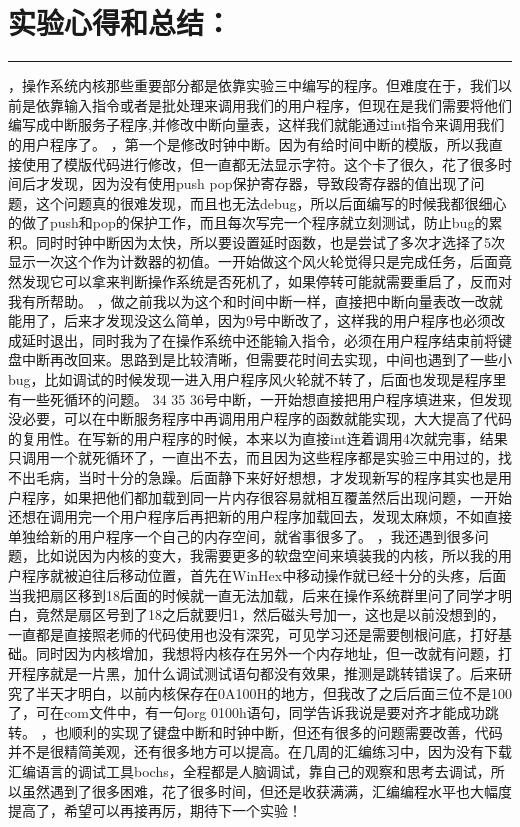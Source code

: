 \documentclass[UTF8]{article}
\begin{document}
\section{实验心得和总结：}
\noindent\rule[0.2\baselineskip]{\textwidth}{0.5pt}
\heiti
{}，操作系统内核那些重要部分都是依靠实验三中编写的程序。但难度在于，我们以前是依靠输入指令或者是批处理来调用我们的用户程序，但现在是我们需要将他们编写成中断服务子程序,并修改中断向量表，这样我们就能通过int指令来调用我们的用户程序了。
，第一个是修改时钟中断。因为有给时间中断的模版，所以我直接使用了模版代码进行修改，但一直都无法显示字符。这个卡了很久，花了很多时间后才发现，因为没有使用push pop保护寄存器，导致段寄存器的值出现了问题，这个问题真的很难发现，而且也无法debug，所以后面编写的时候我都很细心的做了push和pop的保护工作，而且每次写完一个程序就立刻测试，防止bug的累积。同时时钟中断因为太快，所以要设置延时函数，也是尝试了多次才选择了5次显示一次这个作为计数器的初值。一开始做这个风火轮觉得只是完成任务，后面竟然发现它可以拿来判断操作系统是否死机了，如果停转可能就需要重启了，反而对我有所帮助。
，做之前我以为这个和时间中断一样，直接把中断向量表改一改就能用了，后来才发现没这么简单，因为9号中断改了，这样我的用户程序也必须改成延时退出，同时我为了在操作系统中还能输入指令，必须在用户程序结束前将键盘中断再改回来。思路到是比较清晰，但需要花时间去实现，中间也遇到了一些小bug，比如调试的时候发现一进入用户程序风火轮就不转了，后面也发现是程序里有一些死循环的问题。
 34 35 36号中断，一开始想直接把用户程序填进来，但发现没必要，可以在中断服务程序中再调用用户程序的函数就能实现，大大提高了代码的复用性。在写新的用户程序的时候，本来以为直接int连着调用4次就完事，结果只调用一个就死循环了，一直出不去，而且因为这些程序都是实验三中用过的，找不出毛病，当时十分的急躁。后面静下来好好想想，才发现新写的程序其实也是用户程序，如果把他们都加载到同一片内存很容易就相互覆盖然后出现问题，一开始还想在调用完一个用户程序后再把新的用户程序加载回去，发现太麻烦，不如直接单独给新的用户程序一个自己的内存空间，就省事很多了。
，我还遇到很多问题，比如说因为内核的变大，我需要更多的软盘空间来填装我的内核，所以我的用户程序就被迫往后移动位置，首先在WinHex中移动操作就已经十分的头疼，后面当我把扇区移到18后面的时候就一直无法加载，后来在操作系统群里问了同学才明白，竟然是扇区号到了18之后就要归1，然后磁头号加一，这也是以前没想到的，一直都是直接照老师的代码使用也没有深究，可见学习还是需要刨根问底，打好基础。同时因为内核增加，我想将内核存在另外一个内存地址，但一改就有问题，打开程序就是一片黑，加什么调试测试语句都没有效果，推测是跳转错误了。后来研究了半天才明白，以前内核保存在0A100H的地方，但我改了之后后面三位不是100了，可在com文件中，有一句org 0100h语句，同学告诉我说是要对齐才能成功跳转。
，也顺利的实现了键盘中断和时钟中断，但还有很多的问题需要改善，代码并不是很精简美观，还有很多地方可以提高。在几周的汇编练习中，因为没有下载汇编语言的调试工具bochs，全程都是人脑调试，靠自己的观察和思考去调试，所以虽然遇到了很多困难，花了很多时间，但还是收获满满，汇编编程水平也大幅度提高了，希望可以再接再厉，期待下一个实验！
\end{document}

